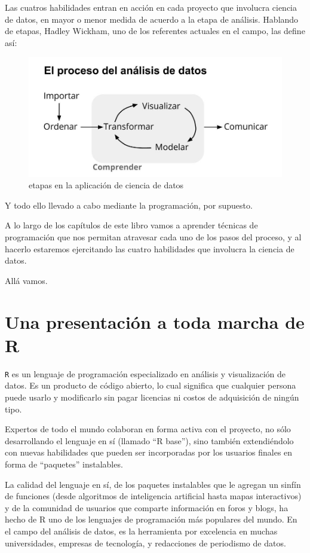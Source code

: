 \documentclass[spanish,]{book}
\begin{document}
Las cuatros habilidades entran en acción en cada proyecto que involucra ciencia de datos, en mayor o menor medida de acuerdo a la etapa de análisis. Hablando de etapas, Hadley Wickham, uno de los referentes actuales en el campo, las define así:

\begin{figure}
\includegraphics[width=6.28in]{imagenes/proceso_ciencia_datos} \caption{etapas en la aplicación de ciencia de datos}\label{fig:unnamed-chunk-4}
\end{figure}

Y todo ello llevado a cabo mediante la programación, por supuesto.

A lo largo de los capítulos de este libro vamos a aprender técnicas de programación que nos permitan atravesar cada uno de los pasos del proceso, y al hacerlo estaremos ejercitando las cuatro habilidades que involucra la ciencia de datos.

Allá vamos.

\hypertarget{una-presentaciuxf3n-a-toda-marcha-de-r}{%
\chapter{Una presentación a toda marcha de R}\label{una-presentaciuxf3n-a-toda-marcha-de-r}}

\texttt{R} es un lenguaje de programación especializado en análisis y visualización de datos. Es un producto de código abierto, lo cual significa que cualquier persona puede usarlo y modificarlo sin pagar licencias ni costos de adquisición de ningún tipo.

Expertos de todo el mundo colaboran en forma activa con el proyecto, no sólo desarrollando el lenguaje en sí (llamado ``R base''), sino también extendiéndolo con nuevas habilidades que pueden ser incorporadas por los usuarios finales en forma de ``paquetes'' instalables.

La calidad del lenguaje en sí, de los paquetes instalables que le agregan un sinfín de funciones (desde algoritmos de inteligencia artificial hasta mapas interactivos) y de la comunidad de usuarios que comparte información en foros y blogs, ha hecho de R uno de los lenguajes de programación más populares del mundo. En el campo del análisis de datos, es la herramienta por excelencia en muchas universidades, empresas de tecnología, y redacciones de periodismo de datos.
\end{document}
